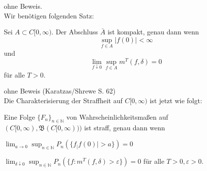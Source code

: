 \documentclass[a4paper,twoside,DIV15,BCOR12mm]{scrbook}
\newcommand{\borel}{{\mathfrak B}}
\begin{document}
ohne Beweis. \\
Wir benötigen folgenden Satz:
\begin{satz}
  \label{satz:14.5}
Sei $A\subset C[0,\infty)$. Der Abschluss $\bar A$ ist kompakt, genau dann wenn
\[
\sup_{f\in A}\vert f(0)\vert < \infty
\]
und
\[
\lim_{f\downarrow 0} \sup_{f\in A} m^T(f,\delta)=0
\]
für alle $T>0$.
\end{satz}
ohne Beweis (Karatzas/Shrewe S. 62) \\
Die Charakterisierung der Straffheit auf $C[0,\infty)$ ist jetzt wie folgt:
  \begin{satz}
    \label{satz:14.6}
Eine Folge $\{F_n\}_{n\in\mathbb N}$ von Wahrscheinlichkeitsmaßen auf $(C[0,\infty),\borel(C[0,\infty)))$ ist straff, genau dann wenn
      \begin{enuma}
      \item $ \lim_{a\to0}\sup_{n\in\mathbb N}P_n(\{f_\vert f(0)\vert > a\})=0 $
      \item $ \lim_{\delta\downarrow0}\sup_{n\in\mathbb N}P_n(\{f:m^T(f,\delta)>\varepsilon\})=0$ für alle $T>0,\varepsilon>0$.
      \end{enuma}
  \end{satz}
\end{document}
